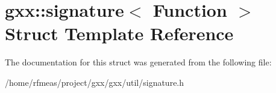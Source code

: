 \hypertarget{structgxx_1_1signature}{}\section{gxx\+:\+:signature$<$ Function $>$ Struct Template Reference}
\label{structgxx_1_1signature}


The documentation for this struct was generated from the following file\+:\begin{DoxyCompactItemize}
\item 
/home/rfmeas/project/gxx/gxx/util/signature.\+h\end{DoxyCompactItemize}
